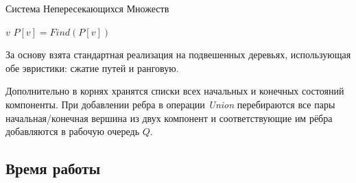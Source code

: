 \begin{algorithm}[h!]
  \begin{algorithmic}[1]
  \caption{Система Непересекающихся Множеств}
  \label{algo:DSU}
          \EndFor
          \EndFor
          \EndFor
      \EndFunction
              \Return $v$
          \EndIf
          \Return $P[v] = Find(P[v])$
      \EndFunction
              \Return
          \EndIf
          \EndIf
      \EndFunction
  \EndStructure
  \end{algorithmic}
\end{algorithm}

За основу взята стандартная реализация \cite{Hopcroft1973} на подвешенных деревьях, использующая обе эвристики: сжатие путей и ранговую. 

Дополнительно в корнях хранятся списки всех начальных и конечных состояний компоненты. При добавлении ребра в операции \textit{Union} перебираются все пары начальная/конечная вершина из двух компонент и соответствующие им рёбра добавляются в рабочую очередь $Q$. 


\subsection*{Время работы}

